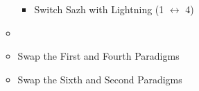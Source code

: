\begin{menu}
\begin{itemize}
\begin{itemize}
\begin{itemize}
					      \item Switch Sazh with Lightning (1 $\leftrightarrow$ 4)
				      \end{itemize}
				\item {}%
				      {\paradigmline{\com}{\sen}{\med}}%
				      {\paradigmline{(\rav)}{\rav}{\rav}}%
				      {\paradigmline{(\rav)}{\sen}{(\rav)}}%
				      {\paradigmline{\rav}{\com}{(\com)}}%
				      {\paradigmline{\rav}{\com}{(\rav)}}%
				      {\paradigmline[6]{\textit{(\com)}}{\textit{\com}}{\textit{(\com)}}}
				\item Swap the First and Fourth Paradigms
				\item Swap the Sixth and Second Paradigms
			\end{itemize}
		\end{itemize}
	\end{menu}

